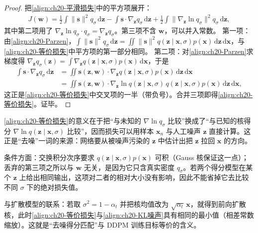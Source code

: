 \documentclass[../../main.tex]{subfiles}
\begin{document}
\begin{proof}
把\eqref{align:ch20-平滑损失}中的平方项展开：
\begin{align*}
J(\bm{w})=\frac{1}{2}\int\|\bm{s}\|^2q_{\sigma}\,\mathrm{d}\bm{z}-\int\bm{s}\cdot\nabla_{\bm{z}}q_{\sigma}\,\mathrm{d}\bm{z}+\frac{1}{2}\int\|\nabla_{\bm{z}}\ln q_{\sigma}\|^2q_{\sigma}\,\mathrm{d}\bm{z},
\end{align*}
其中第二项用了 $\nabla_{\bm{z}}\ln q_{\sigma}\cdot q_{\sigma}=\nabla_{\bm{z}}q_{\sigma}$。第三项不含 $\bm{w}$，可以并入常数。
第一项：由\eqref{align:ch20-Parzen}，$\int\|\bm{s}\|^2q_{\sigma}\,\mathrm{d}\bm{z}=\iint\|\bm{s}\|^2q(\bm{z}\mid\bm{x},\sigma)p(\bm{x})\,\mathrm{d}\bm{z}\,\mathrm{d}\bm{x}$，与\eqref{align:ch20-等价损失}中平方项的第一部分相同。
第二项：对\eqref{align:ch20-Parzen}求梯度得 $\nabla_{\bm{z}}q_{\sigma}(\bm{z})=\int\nabla_{\bm{z}}q(\bm{z}\mid\bm{x},\sigma)p(\bm{x})\,\mathrm{d}\bm{x}$，于是
\begin{align*}
\int\bm{s}\cdot\nabla_{\bm{z}}q_{\sigma}\,\mathrm{d}\bm{z}&=\iint\bm{s}(\bm{z},\bm{w})\cdot\nabla_{\bm{z}}q(\bm{z}\mid\bm{x},\sigma)p(\bm{x})\,\mathrm{d}\bm{z}\,\mathrm{d}\bm{x}\\
&=\iint\bm{s}(\bm{z},\bm{w})\cdot\nabla_{\bm{z}}\ln q(\bm{z}\mid\bm{x},\sigma)\,q(\bm{z}\mid\bm{x},\sigma)p(\bm{x})\,\mathrm{d}\bm{z}\,\mathrm{d}\bm{x},
\end{align*}
这正是\eqref{align:ch20-等价损失}中交叉项的一半（带负号）。合并三项即得\eqref{align:ch20-等价损失}。证毕。
\end{proof}

\begin{remark}
\eqref{align:ch20-等价损失}的意义在于把“与未知的 $\nabla\ln q_{\sigma}$ 比较”换成了“与已知的核得分 $\nabla\ln q(\bm{z}\mid\bm{x},\sigma)$ 比较”，因而损失可以用样本 $\bm{x}_n$ 与人工噪声 $\bm{z}$ 直接计算。这正是“去噪”一词的来源：网络要从被噪声污染的 $\bm{z}$ 中估计出把 $\bm{z}$ 拉回 $\bm{x}$ 的方向。\par
条件方面：交换积分次序要求 $q(\bm{z}\mid\bm{x},\sigma)p(\bm{x})$ 可积（Gauss 核保证这一点）；丢弃的第三项之所以与 $\bm{w}$ 无关，是因为它只含真实密度 $q_{\sigma}$。若两个得分模型在某个 $\bm{z}$ 上给出相同输出，这项对二者的相对大小没有影响，因此不能省掉它去比较不同 $\sigma$ 下的绝对损失值。\par
与扩散模型的联系：若取 $\sigma^2=1-\alpha_t$ 并把核均值改为 $\sqrt{\alpha_t}\,\bm{x}$，就得到前向扩散核，此时\eqref{align:ch20-等价损失}与\eqref{align:ch20-KL噪声}具有相同的最小值（相差常数缩放）。这就是“去噪得分匹配”与 DDPM 训练目标等价的含义。
\end{remark}
\end{document}
